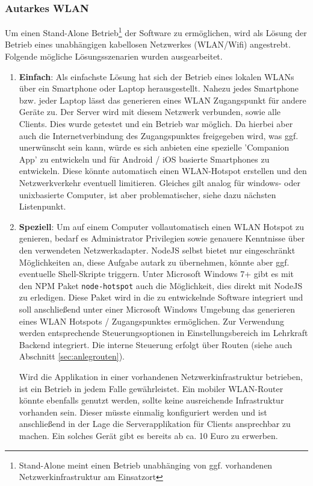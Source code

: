 \subsubsection{Autarkes WLAN}\label{sec:eigeneswlan}
Um einen Stand-Alone Betrieb\footnote{Stand-Alone meint einen Betrieb unabhänging von ggf. vorhandenen Netzwerkinfrastruktur am Einsatzort} der Software zu ermöglichen, wird als Lösung der Betrieb eines unabhängigen kabellosen Netzwerkes (WLAN/Wifi) angestrebt. Folgende mögliche Lösungsszenarien wurden ausgearbeitet.
\begin{enumerate}
	\item \textbf{Einfach}: Als einfachste Lösung hat sich der Betrieb eines lokalen WLANs über ein Smartphone oder Laptop herausgestellt. Nahezu jedes Smartphone bzw. jeder Laptop lässt das generieren eines WLAN Zugangspunkt für andere Geräte zu. Der Server wird mit diesem Netzwerk verbunden, sowie alle Clients. Dies wurde getestet und ein Betrieb war möglich. Da hierbei aber auch die Internetverbindung des Zugangspunktes freigegeben wird, was ggf. unerwünscht sein kann, würde es sich anbieten eine spezielle 'Companion App' zu entwickeln und für Android / iOS basierte Smartphones zu entwickeln. Diese könnte automatisch einen WLAN-Hotspot erstellen und den Netzwerkverkehr eventuell limitieren. Gleiches gilt analog für windows- oder unixbasierte Computer, ist aber problematischer, siehe dazu nächsten Listenpunkt.
	\item \textbf{Speziell}: Um auf einem Computer vollautomatisch einen WLAN Hotspot zu genieren, bedarf es Administrator Privilegien sowie genauere Kenntnisse über den verwendeten Netzwerkadapter. NodeJS selbst bietet nur eingeschränkt Möglichkeiten an, diese Aufgabe autark zu übernehmen, könnte aber ggf. eventuelle Shell-Skripte triggern. Unter Microsoft Windows 7+ gibt es mit den NPM Paket \texttt{node-hotspot} auch die Möglichkeit, dies direkt mit NodeJS zu erledigen. Diese Paket wird in die zu entwickelnde Software integriert und soll anschließend unter einer Microsoft Windows Umgebung das generieren eines WLAN Hotspots / Zugangspunktes ermöglichen. Zur Verwendung werden entsprechende Steuerungsoptionen in Einstellungsbereich im Lehrkraft Backend integriert. Die interne Steuerung erfolgt über Routen (siehe auch Abschnitt \ref{sec:anlegrouten}).
	
Wird die Applikation in einer vorhandenen Netzwerkinfrastruktur betrieben, ist ein Betrieb in jedem Falle gewährleistet. Ein mobiler WLAN-Router könnte ebenfalls genutzt werden, sollte keine ausreichende Infrastruktur vorhanden sein. Dieser müsste einmalig konfiguriert werden und ist anschließend in der Lage die Serverapplikation für Clients ansprechbar zu machen. Ein solches Gerät gibt es bereits ab ca. 10 Euro zu erwerben.
\end{enumerate} 


